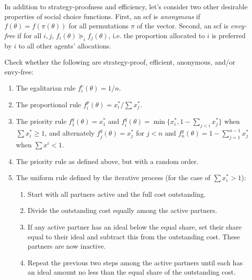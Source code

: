 \documentclass[10pt]{article}
\begin{document}
\begin{spacing}{1.0}
\begin{exercise}[Sprumont 1991]
  \vspace{.5em}
  In addition to strategy-proofness and efficiency, let's consider two
  other desirable properties of social choice functions. First, an scf is
  \emph{anonymous} if $f(\theta)=f(\pi(\theta))$ for all permutations $\pi$
  of the vector. Second, an scf is \emph{envy-free} if for all $i,j$,
  $f_i(\theta) \succeq_i f_j(\theta)$, i.e. the proportion allocated to $i$
  is preferred by $i$ to all other agents' allocations.

  \vspace{.5em}
  Check whether the following are strategy-proof,
  efficient, anonymous, and/or envy-free:
  \begin{enumerate}
  \item The egalitarian rule $f_i^e(\theta) = 1/n$.
  \item The proportional rule $f_i^p(\theta) = x_i^*/\sum x_j^*$.
  \item The priority rule $f_1^q(\theta) = x_1^*$ and
    $f_i^q(\theta) = \min\{x_i^*, 1-\sum_{j<i} x_j^*\}$
    when $\sum x_i^* \geq 1$, and alternately $f_j^q(\theta) = x_j^*$
    for $j < n$ and $f_n^q(\theta) = 1 - \sum_{j=1}^{n-1}
    x_j^*$ when $\sum x^i < 1$.
  \item The priority rule as defined above, but with a random order.
  \item The uniform rule defined by the iterative process (for the case of
    $\sum x_i^* > 1$):
    \begin{enumerate}
    \item Start with all partners active and the full cost outstanding.
    \item Divide the outstanding cost equally among the active partners.
    \item If any active partner has an ideal below the equal
      share, set their share equal to their ideal and
      subtract this from the outstanding cost. These
      partners are now inactive.
    \item Repeat the previous two steps among the active
      partners until each has an ideal amount no less
      than the equal share of the outstanding cost.
    \end{enumerate}

  \end{enumerate}

\end{exercise}


\end{spacing}
\end{document}
